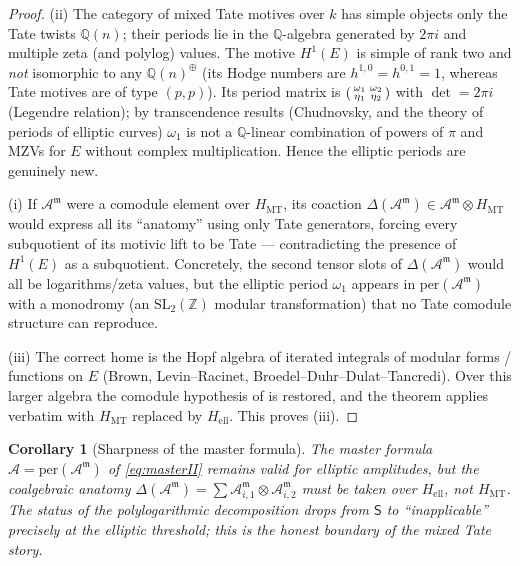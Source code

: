 \documentclass[12pt]{article}
\newtheorem{corollary}[theorem]{Corollary}
\theoremstyle{definition}
\theoremstyle{remark}
\newcommand{\per}{\mathrm{per}}
\newcommand{\Am}{\mathcal{A}}
\newcommand{\Amm}{\mathcal{A}^{\mathfrak{m}}}
\newcommand{\coA}{\Delta}
\newcommand{\Qbb}{\mathbb{Q}}
\newcommand{\Zbb}{\mathbb{Z}}
\newcommand{\Slab}{\ensuremath{\mathsf{S}}}
\begin{document}
\begin{proof}
(ii) The category of mixed Tate motives over $k$ has simple objects only the Tate twists
$\Qbb(n)$; their periods lie in the $\Qbb$-algebra generated by $2\pi i$ and multiple zeta
(and polylog) values. The motive $H^1(E)$ is simple of rank two and \emph{not} isomorphic to
any $\Qbb(n)^{\oplus}$ (its Hodge numbers are $h^{1,0}=h^{0,1}=1$, whereas Tate motives are
of type $(p,p)$). Its period matrix is $\begin{psmallmatrix}\omega_1&\omega_2\\ \eta_1&\eta_2
\end{psmallmatrix}$ with $\det=2\pi i$ (Legendre relation); by transcendence results
(Chudnovsky, and the theory of periods of elliptic curves) $\omega_1$ is not a $\Qbb$-linear
combination of powers of $\pi$ and MZVs for $E$ without complex multiplication. Hence the
elliptic periods are genuinely new.

(i) If $\Amm$ were a comodule element over $H_{\mathrm{MT}}$, its coaction
$\coA(\Amm)\in\Amm\otimes H_{\mathrm{MT}}$ would express all its ``anatomy'' using only Tate
generators, forcing every subquotient of its motivic lift to be Tate --- contradicting the
presence of $H^1(E)$ as a subquotient. Concretely, the second tensor slots of $\coA(\Amm)$
would all be logarithms/zeta values, but the elliptic period $\omega_1$ appears in
$\per(\Amm)$ with a monodromy (an $\mathrm{SL}_2(\Zbb)$ modular transformation) that no Tate
comodule structure can reproduce.

(iii) The correct home is the Hopf algebra of iterated integrals of modular forms / functions
on $E$ (Brown, Levin--Racinet, Broedel--Duhr--Dulat--Tancredi). Over this larger algebra the
comodule hypothesis of  is restored, and the theorem applies verbatim with
$H_{\mathrm{MT}}$ replaced by $H_{\mathrm{ell}}$. This proves (iii).
\end{proof}

\begin{corollary}[Sharpness of the master formula]
The master formula $\Am=\per(\Amm)$ of \eqref{eq:masterII} remains valid for elliptic
amplitudes, but the \emph{coalgebraic anatomy} $\coA(\Amm)=\sum\Amm_{i,1}\otimes\Amm_{i,2}$
must be taken over $H_{\mathrm{ell}}$, not $H_{\mathrm{MT}}$. The status of the
polylogarithmic decomposition drops from \Slab{} to ``inapplicable'' precisely at the elliptic
threshold; this is the honest boundary of the mixed Tate story.
\end{corollary}
\end{document}
